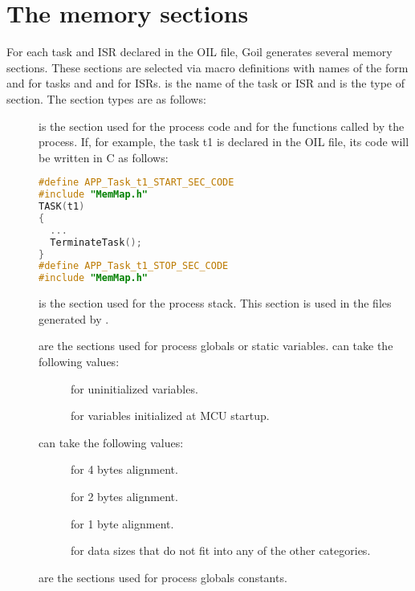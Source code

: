 \section{The memory sections}

For each task and ISR declared in the OIL file, Goil generates several memory sections. These sections are selected via macro definitions with names of the form  and  for tasks and  and  for ISRs.  is the name of the task or ISR and  is the type of section. The section types are as follows:

\begin{description}

\item[] is the section used for the process code and for the functions called by the process. If, for example, the task t1 is declared in the OIL file, its code will be written in C as follows:
\begin{lstlisting}[language=C]
#define APP_Task_t1_START_SEC_CODE
#include "MemMap.h"
TASK(t1)
{
  ...
  TerminateTask();
}
#define APP_Task_t1_STOP_SEC_CODE
#include "MemMap.h"
\end{lstlisting}

\item[] is the section used for the process stack. This section is used in the files generated by \goil.

\item[] are the sections used for process globals or static variables.  can take the following values:
  \begin{description}
  \item[] for uninitialized variables.
  \item[] for variables initialized at MCU startup.
  \end{description}
 can take the following values:
  \begin{description}
  \item[] for 4 bytes alignment.
  \item[] for 2 bytes alignment.
  \item[] for 1 byte alignment.
  \item[] for data sizes that do not fit into any of the other categories.
  \end{description}

\item[] are the sections used for process globals constants.
\end{description}

